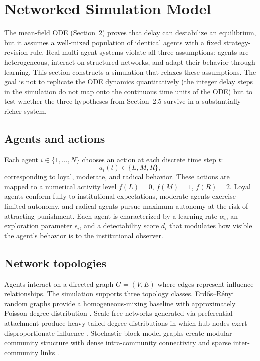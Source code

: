 \section{Networked Simulation Model}

The mean-field ODE (Section~2) proves that delay can destabilize an equilibrium, but it assumes a well-mixed population of identical agents with a fixed strategy-revision rule. Real multi-agent systems violate all three assumptions: agents are heterogeneous, interact on structured networks, and adapt their behavior through learning. This section constructs a simulation that relaxes these assumptions. The goal is not to replicate the ODE dynamics quantitatively (the integer delay steps in the simulation do not map onto the continuous time units of the ODE) but to test whether the three hypotheses from Section~2.5 survive in a substantially richer system.

\subsection{Agents and actions}

Each agent $i\in\{1,\ldots,N\}$ chooses an action at each discrete time step $t$:
\[
    a_i(t)\in\{L,M,R\},
\]
corresponding to loyal, moderate, and radical behavior. These actions are mapped to a numerical activity level $f(L)=0$, $f(M)=1$, $f(R)=2$. Loyal agents conform fully to institutional expectations, moderate agents exercise limited autonomy, and radical agents pursue maximum autonomy at the risk of attracting punishment. Each agent is characterized by a learning rate $\alpha_i$, an exploration parameter $\epsilon_i$, and a detectability score $d_i$ that modulates how visible the agent's behavior is to the institutional observer.

\subsection{Network topologies}

Agents interact on a directed graph $G=(V,E)$ where edges represent influence relationships. The simulation supports three topology classes. Erd\H{o}s--R\'enyi random graphs provide a homogeneous-mixing baseline with approximately Poisson degree distribution \citep{szabo2007evolutionary}. Scale-free networks generated via preferential attachment produce heavy-tailed degree distributions in which hub nodes exert disproportionate influence \citep{santos2005scalefree}. Stochastic block model graphs create modular community structure with dense intra-community connectivity and sparse inter-community links \citep{holland1983stochastic, girvan2002community}.

